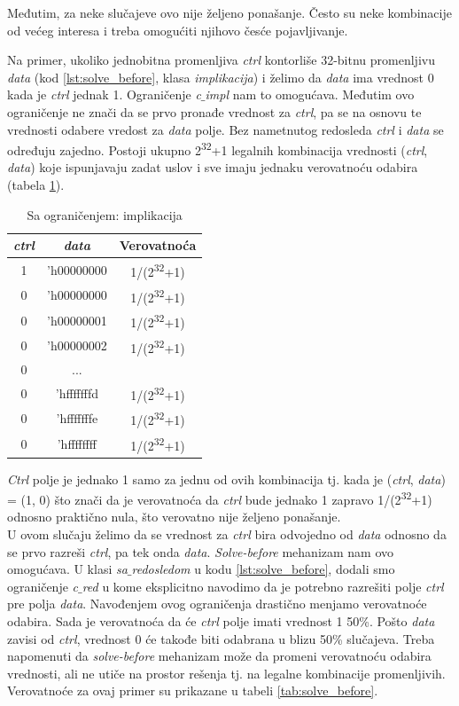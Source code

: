 Međutim, za neke slučajeve ovo nije željeno ponašanje.
Često su neke kombinacije od većeg interesa i treba omogućiti njihovo česće
pojavljivanje.

Na primer, ukoliko jednobitna promenljiva \emph{ctrl} kontorliše
32-bitnu promenljivu \emph{data} (kod \ref{lst:solve_before}, klasa
\emph{implikacija}) i želimo da \emph{data} ima vrednost 0 kada je \emph{ctrl}
jednak 1.
Ograničenje \emph{c\(\_\)impl} nam to omogućava.
Međutim ovo ograničenje ne znači da se prvo pronađe vrednost za \emph{ctrl}, pa
se na osnovu te vrednosti odabere vredost za \emph{data} polje.
Bez nametnutog redosleda \emph{ctrl} i \emph{data} se određuju zajedno.
Postoji ukupno 2\textsuperscript{32}+1 legalnih kombinacija vrednosti
(\emph{ctrl}, \emph{data}) koje ispunjavaju zadat uslov i sve imaju jednaku
verovatnoću odabira (tabela \ref{tab:impl}).

\begin{table}[!htb]
  \centering
  \begin{tabular}{|c|c|c|}\hline
    \textbf{\emph{ctrl}}&\textbf{\emph{data}}&\textbf{Verovatnoća} \\ \hline
    1&'h00000000&1/(2\textsuperscript{32}+1) \\ \hline
    0&'h00000000&1/(2\textsuperscript{32}+1) \\ \hline
    0&'h00000001&1/(2\textsuperscript{32}+1) \\ \hline
    0&'h00000002&1/(2\textsuperscript{32}+1) \\ \hline
    0&...& \\ \hline
    0&'hfffffffd&1/(2\textsuperscript{32}+1) \\ \hline
    0&'hfffffffe&1/(2\textsuperscript{32}+1) \\ \hline
    0&'hffffffff&1/(2\textsuperscript{32}+1) \\ \hline
  \end{tabular}
  \caption{Sa ograničenjem: implikacija}\label{tab:impl}
\end{table}

\emph{Ctrl} polje je jednako 1 samo za jednu od ovih kombinacija tj. kada je
(\emph{ctrl}, \emph{data}) = (1, 0) što znači da je verovatnoća da \emph{ctrl}
bude jednako 1 zapravo 1/(2\textsuperscript{32}+1) odnosno praktično nula, što
verovatno nije željeno ponašanje.\\

U ovom slučaju želimo da se vrednost za \emph{ctrl} bira odvojedno od
\emph{data} odnosno da se prvo razreši \emph{ctrl}, pa tek onda \emph{data}.
\emph{Solve-before} mehanizam nam ovo omogućava.
U klasi \emph{sa\(\_\)redosledom} u kodu \ref{lst:solve_before}, dodali smo
ograničenje \emph{c\(\_\)red} u kome eksplicitno navodimo da je potrebno
razrešiti polje \emph{ctrl} pre polja \emph{data}.
Navođenjem ovog ograničenja drastično menjamo verovatnoće odabira.
Sada je verovatnoća da će \emph{ctrl} polje imati vrednost 1 50\%.
Pošto \emph{data} zavisi od \emph{ctrl}, vrednost 0 će takođe biti odabrana u
blizu 50\% slučajeva.
Treba napomenuti da \emph{solve-before} mehanizam može da promeni verovatnoću
odabira vrednosti, ali ne utiče na prostor rešenja tj. na legalne kombinacije
promenljivih.
Verovatnoće za ovaj primer su prikazane u tabeli \ref{tab:solve_before}.

